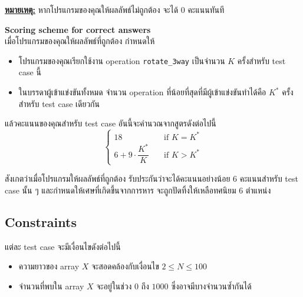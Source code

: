 \noindent
\textbf{\uline{หมายเหตุ:}} หากโปรแกรมของคุณให้ผลลัพธ์ไม่ถูกต้อง จะได้ 0 คะแนนทันที\newline

\smallskip\noindent
{\sectionfont\bfseries Scoring scheme for correct answers} \\
เมื่อโปรแกรมของคุณให้ผลลัพธ์ที่ถูกต้อง กำหนดให้

\begin{itemize}
\item โปรแกรมของคุณเรียกใช้งาน operation \lstinline|rotate_3way| 
    เป็นจำนวน $K$ ครั้งสำหรับ test case นี้
\item ในบรรดาผู้เข้าแข่งขันทั้งหมด จำนวน operation ที่น้อยที่สุดที่มีผู้เข้าแข่งขันทำได้คือ $K^*$ ครั้ง 
    สำหรับ test case เดียวกัน
\end{itemize}
แล้วคะแนนของคุณสำหรับ test case อันนี้จะคำนวณจากสูตรดังต่อไปนี้
\[
    \begin{cases}
    18 &\quad\text{if $K = K^*$} \\
    6 + 9 \cdot\dfrac{K^*}{K} &\quad\text{if $K > K^*$}
    \end{cases}
\]

สังเกตว่าเมื่อโปรแกรมให้ผลลัพธ์ที่ถูกต้อง รับประกันว่าจะได้คะแนนอย่างน้อย 6 คะแนนสำหรับ test case นั้น ๆ\;
และกำหนดให้เศษที่เกิดขึ้นจากการหาร จะถูกปัดทิ้งให้เหลือทศนิยม 6 ตำแหน่ง

\subsection*{\sectionfont\upshape Constraints}

แต่ละ test case จะมีเงื่อนไขดังต่อไปนี้
\begin{itemize}
\item ความยาวของ array $X$ จะสอดคล้องกับเงื่อนไข $2 \leq N \leq 100$
\item จำนวนที่พบใน array $X$ จะอยู่ในช่วง $0$ ถึง $1000$ ซึ่งอาจมีบางจำนวนซ้ำกันได้
\end{itemize}
